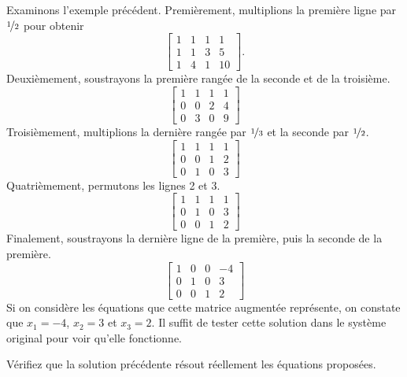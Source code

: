 Examinons l’exemple précédent. Premièrement, multiplions la première ligne par
$\nicefrac{1}{2}$ pour obtenir
\begin{equation*}
\left[
\begin{array}{ccc|c}
1 & 1 & 1 & 1 \\
1 & 1 & 3 & 5 \\
1 & 4 & 1 & 10
\end{array}
\right] .
\end{equation*}
Deuxièmement, soustrayons la première rangée de la seconde et de la troisième.
\begin{equation*}
\left[
\begin{array}{ccc|c}
1 & 1 & 1 & 1 \\
0 & 0 & 2 & 4 \\
0 & 3 & 0 & 9
\end{array}
\right]
\end{equation*}
Troisièmement, multiplions la dernière rangée par $\nicefrac{1}{3}$ et la seconde par $\nicefrac{1}{2}$.
\begin{equation*}
\left[
\begin{array}{ccc|c}
1 & 1 & 1 & 1 \\
0 & 0 & 1 & 2 \\
0 & 1 & 0 & 3
\end{array}
\right]
\end{equation*}
Quatrièmement, permutons les lignes 2 et 3.
\begin{equation*}
\left[
\begin{array}{ccc|c}
1 & 1 & 1 & 1 \\
0 & 1 & 0 & 3 \\
0 & 0 & 1 & 2
\end{array}
\right]
\end{equation*}
Finalement, soustrayons la dernière ligne de la première, puis  la seconde de la première.
\begin{equation*}
\left[
\begin{array}{ccc|c}
1 & 0 & 0 & -4 \\
0 & 1 & 0 & 3 \\
0 & 0 & 1 & 2
\end{array}
\right]
\end{equation*}
Si on considère les équations que cette matrice augmentée représente, on constate que
$x_1 = -4$, $x_2 = 3$ et $x_3 = 2$.  Il suffit de tester cette solution dans le système original pour voir qu’elle fonctionne.

\begin{exercise}
Vérifiez que la solution précédente résout réellement les équations proposées.
\end{exercise}

